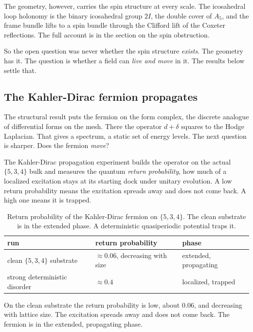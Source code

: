 The geometry, however, carries the spin structure at every scale. The icosahedral loop holonomy is the binary icosahedral group $2I$, the double cover of $A_5$, and the frame bundle lifts to a spin bundle through the Clifford lift of the Coxeter reflections. The full account is in the section on the spin obstruction.

So the open question was never whether the spin structure \emph{exists}. The geometry has it. The question is whether a field can \emph{live and move} in it. The results below settle that.

\subsection{The Kahler-Dirac fermion propagates}

The structural result puts the fermion on the form complex, the discrete analogue of differential forms on the mesh. There the operator $d + \delta$ squares to the Hodge Laplacian. That gives a spectrum, a static set of energy levels. The next question is sharper. Does the fermion \emph{move}?

The Kahler-Dirac propagation experiment builds the operator on the actual $\{5,3,4\}$ bulk and measures the quantum \emph{return probability}, how much of a localized excitation stays at its starting dock under unitary evolution. A low return probability means the excitation spreads away and does not come back. A high one means it is trapped.

\begin{table}[ht]
\centering
\begin{tabular}{@{}lll@{}}
\toprule
run & return probability & phase \\
\midrule
clean $\{5,3,4\}$ substrate & $\approx 0.06$, decreasing with size & extended, propagating \\
strong deterministic disorder & $\approx 0.4$ & localized, trapped \\
\bottomrule
\end{tabular}
\caption{Return probability of the Kahler-Dirac fermion on $\{5,3,4\}$. The clean substrate is in the extended phase. A deterministic quasiperiodic potential traps it.}
\label{tab:kahler-dirac-534}
\end{table}

On the clean substrate the return probability is low, about $0.06$, and decreasing with lattice size. The excitation spreads away and does not come back. The fermion is in the extended, propagating phase.

